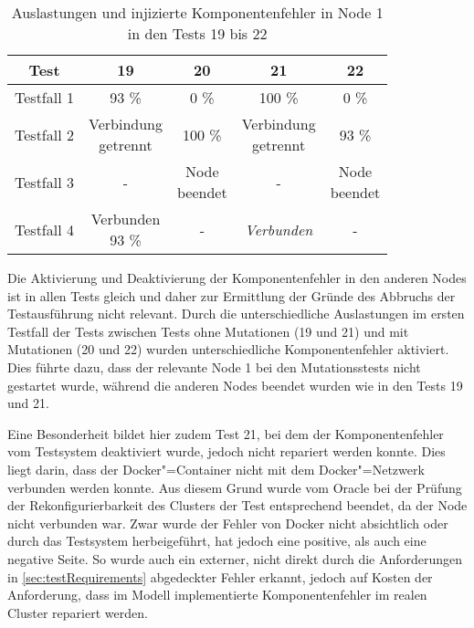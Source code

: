 \begin{table}[h]
    \begin{tabular}{c|cccc}
    	   Test    &                19                 &             20             &                21                 &             22             \\ \hline
    	Testfall 1 &               93 \%               &            0 \%            &              100 \%               &            0 \%            \\
    	Testfall 2 & \makecell{Verbindung \\ getrennt} &          100  \%           & \makecell{Verbindung \\ getrennt} &           93  \%           \\
    	Testfall 3 &                 -                 & \makecell{Node \\ beendet} &                 -                 & \makecell{Node \\ beendet} \\
    	Testfall 4 &   \makecell{Verbunden \\ 93 \%}   &             -              &         \emph{Verbunden}          &             -
    \end{tabular} 
    \caption{Auslastungen und injizierte Komponentenfehler in Node 1 in den Tests 19 bis 22}
    \label{tab:loadNode1Tests1922}
\end{table}

Die Aktivierung und Deaktivierung der Komponentenfehler in den anderen Nodes ist in allen Tests gleich und daher zur Ermittlung der Gründe des Abbruchs der Testausführung nicht relevant.
Durch die unterschiedliche Auslastungen im ersten Testfall der Tests zwischen Tests ohne Mutationen (19 und 21) und mit Mutationen (20 und 22) wurden unterschiedliche Komponentenfehler aktiviert.
Dies führte dazu, dass der relevante Node 1 bei den Mutationsstests nicht gestartet wurde, während die anderen Nodes beendet wurden wie in den Tests 19 und 21.

Eine Besonderheit bildet hier zudem Test 21, bei dem der Komponentenfehler vom Testsystem deaktiviert wurde, jedoch nicht repariert werden konnte.
Dies liegt darin, dass der Docker"=Container nicht mit dem Docker"=Netzwerk verbunden werden konnte.
Aus diesem Grund wurde vom Oracle bei der Prüfung der Rekonfigurierbarkeit des Clusters der Test entsprechend beendet, da der Node nicht verbunden war.
Zwar wurde der Fehler von Docker nicht absichtlich oder durch das Testsystem herbeigeführt, hat jedoch eine positive, als auch eine negative Seite.
So wurde auch ein externer, nicht direkt durch die Anforderungen in \autoref{sec:testRequirements} abgedeckter Fehler erkannt, jedoch auf Kosten der Anforderung, dass im Modell implementierte Komponentenfehler im realen Cluster repariert werden.

